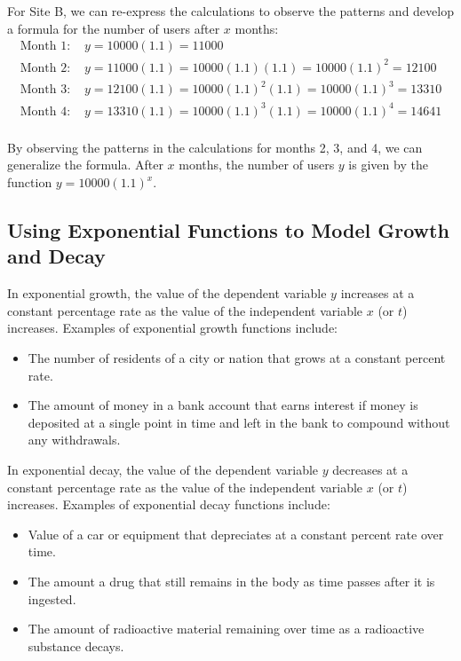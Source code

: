 For Site B, we can re-express the calculations to observe the patterns and develop a formula for the number of users after \( x \) months:
\begin{align*}
    \text{Month 1: } & y = 10000(1.1) = 11000                                    \\
    \text{Month 2: } & y = 11000(1.1) = 10000(1.1)(1.1) = 10000(1.1)^2 = 12100   \\
    \text{Month 3: } & y = 12100(1.1) = 10000(1.1)^2(1.1) = 10000(1.1)^3 = 13310 \\
    \text{Month 4: } & y = 13310(1.1) = 10000(1.1)^3(1.1) = 10000(1.1)^4 = 14641 \\
\end{align*}

By observing the patterns in the calculations for months 2, 3, and 4, we can generalize the formula. After \( x \) months, the number of users \( y \) is given by the function \( y = 10000(1.1)^x \).

\subsection{Using Exponential Functions to Model Growth and Decay}

In exponential growth, the value of the dependent variable \( y \) increases at a constant percentage rate as the value of the independent variable \( x \) (or \( t \)) increases. Examples of exponential growth functions include:
\begin{itemize}
    \item The number of residents of a city or nation that grows at a constant percent rate.
    \item The amount of money in a bank account that earns interest if money is deposited at a single point in time and left in the bank to compound without any withdrawals.
\end{itemize}

In exponential decay, the value of the dependent variable \( y \) decreases at a constant percentage rate as the value of the independent variable \( x \) (or \( t \)) increases. Examples of exponential decay functions include:
\begin{itemize}
    \item Value of a car or equipment that depreciates at a constant percent rate over time.
    \item The amount a drug that still remains in the body as time passes after it is ingested.
    \item The amount of radioactive material remaining over time as a radioactive substance decays.
\end{itemize}

